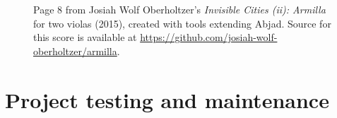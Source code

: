 \documentclass{article}
\begin{document}
\begin{figure}
    \centering
    \caption{
        Page 8 from Josiah Wolf Oberholtzer's \emph{Invisible Cities (ii):
        Armilla} for two violas (2015), created with tools extending Abjad.
        Source for this score is available at
        \url{https://github.com/josiah-wolf-oberholtzer/armilla}. }
    \label{fig:armilla}
\end{figure}

\section{Project testing and maintenance} \label{sec:development}
\end{document}
